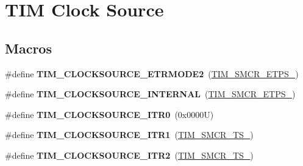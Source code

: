 \hypertarget{group___t_i_m___clock___source}{}\section{T\+IM Clock Source}
\label{group___t_i_m___clock___source}
\subsection*{Macros}
\begin{DoxyCompactItemize}
\item 
\mbox{\label{group___t_i_m___clock___source_gab133f0839cf6a4e858457d48f057eea8}} 
\#define {\bfseries T\+I\+M\+\_\+\+C\+L\+O\+C\+K\+S\+O\+U\+R\+C\+E\+\_\+\+E\+T\+R\+M\+O\+D\+E2}~(\hyperlink{group___peripheral___registers___bits___definition_gabf12f04862dbc92ca238d1518b27b16b}{T\+I\+M\+\_\+\+S\+M\+C\+R\+\_\+\+E\+T\+P\+S\+\_})
\item 
\mbox{\label{group___t_i_m___clock___source_ga9b398a201d8b6a4f200ebde86b1d8f3a}} 
\#define {\bfseries T\+I\+M\+\_\+\+C\+L\+O\+C\+K\+S\+O\+U\+R\+C\+E\+\_\+\+I\+N\+T\+E\+R\+N\+AL}~(\hyperlink{group___peripheral___registers___bits___definition_ga00b43cd09557a69ed10471ed76b228d8}{T\+I\+M\+\_\+\+S\+M\+C\+R\+\_\+\+E\+T\+P\+S\+\_})
\item 
\mbox{\label{group___t_i_m___clock___source_ga3310aa84f2f322eb77538997c070e56a}} 
\#define {\bfseries T\+I\+M\+\_\+\+C\+L\+O\+C\+K\+S\+O\+U\+R\+C\+E\+\_\+\+I\+T\+R0}~(0x0000\+U)
\item 
\mbox{\label{group___t_i_m___clock___source_gae2da814f8d86491e7c344bb8d0f62b96}} 
\#define {\bfseries T\+I\+M\+\_\+\+C\+L\+O\+C\+K\+S\+O\+U\+R\+C\+E\+\_\+\+I\+T\+R1}~(\hyperlink{group___peripheral___registers___bits___definition_ga8d1f040f9259acb3c2fba7b0c7eb3d96}{T\+I\+M\+\_\+\+S\+M\+C\+R\+\_\+\+T\+S\+\_})
\item 
\mbox{\label{group___t_i_m___clock___source_gafb779719a41769b14303da4977f6a5f1}} 
\#define {\bfseries T\+I\+M\+\_\+\+C\+L\+O\+C\+K\+S\+O\+U\+R\+C\+E\+\_\+\+I\+T\+R2}~(\hyperlink{group___peripheral___registers___bits___definition_gacb82212fcc89166a43ff97542da9182d}{T\+I\+M\+\_\+\+S\+M\+C\+R\+\_\+\+T\+S\+\_})

\end{DoxyCompactItemize}

